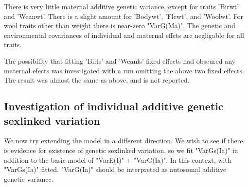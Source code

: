 \documentclass[titlepage]{article}  %
\begin{document}
There is very little maternal additive genetic variance, except for traits 'Birwt' and 'Weanwt'. There is a slight amount for 'Bodywt', 'Flcwt', and 'Woolwt'. For wool traits other than weight there is near-zero "VarG(Ma)". The genetic and environmental covariances of individual and maternal effcts are negligable for all traits.

The possibility that fitting 'Birls' and 'Weanls' fixed effects had obscured any maternal efects was investigated with a run omitting the above two fixed effects. The result was almost the same as above, and is not reported.

\subsection{Investigation of individual additive genetic sexlinked variation}

We now try extending the model in a different direction. We wish to see if there is evidence for existence of genetic sexlinked variation, so we fit "VarGs(Ia)" in addition to the basic model of "VarE(I)" + "VarG(Ia)". In this context, with "VarGs(Ia)" fitted, "VarG(Ia)" should be interpreted as autosomal additive genetic variance.
\end{document}
